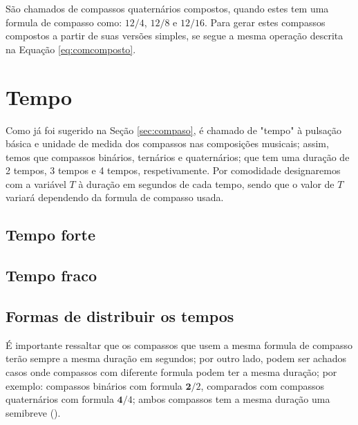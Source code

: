 São chamados de compassos quaternários compostos,  
quando estes tem uma formula de compasso como: $12/4$, $12/8$ e $12/16$.
Para gerar estes compassos compostos a partir de suas versões simples,
se segue a mesma operação descrita na Equação \ref{eq:comcomposto}.
 


\section{Tempo}

Como já foi sugerido na Seção \ref{sec:compaso}, é chamado de "tempo" 
à pulsação básica e unidade de medida dos compassos nas composições musicais;
assim, temos que compassos binários, ternários e quaternários; que tem uma duração de 2 tempos, 
3 tempos e 4 tempos, respetivamente. Por comodidade designaremos com a variável $T$ à duração em segundos de cada tempo,
sendo que o valor de $T$ variará dependendo da formula de compasso usada.
\subsection{Tempo forte}


\subsection{Tempo fraco}

\subsection{Formas de distribuir os tempos}
É importante ressaltar que os compassos que usem a mesma formula de compasso terão sempre a mesma duração em segundos;
por outro lado, podem ser achados casos onde compassos com diferente formula podem ter a mesma duração;
por exemplo: compassos binários com formula $\mathbf{2}/2$, comparados com compassos quaternários com 
formula $\mathbf{4}/4$; ambos compassos tem a mesma duração uma semibreve (\fullnote).

